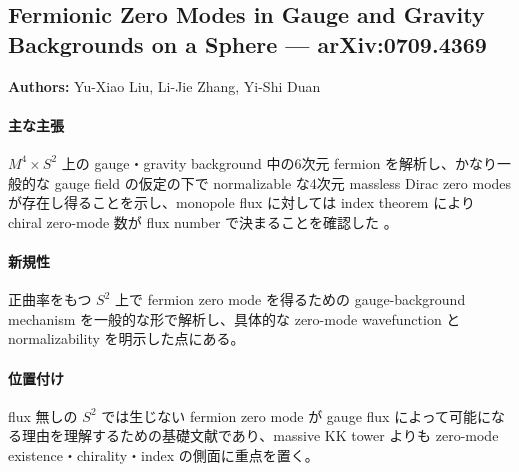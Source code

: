 \subsection{Fermionic Zero Modes in Gauge and Gravity Backgrounds on a Sphere --- arXiv:0709.4369}

\textbf{Authors:} Yu-Xiao Liu, Li-Jie Zhang, Yi-Shi Duan

\paragraph{主な主張}
$M^4\times S^2$ 上の gauge・gravity background 中の6次元 fermion を解析し、かなり一般的な gauge field の仮定の下で normalizable な4次元 massless Dirac zero modes が存在し得ることを示し、monopole flux に対しては index theorem により chiral zero-mode 数が flux number で決まることを確認した \cite{Liu:2007SphereZeroModes}。

\paragraph{新規性}
正曲率をもつ $S^2$ 上で fermion zero mode を得るための gauge-background mechanism を一般的な形で解析し、具体的な zero-mode wavefunction と normalizability を明示した点にある。

\paragraph{位置付け}
flux 無しの $S^2$ では生じない fermion zero mode が gauge flux によって可能になる理由を理解するための基礎文献であり、massive KK tower よりも zero-mode existence・chirality・index の側面に重点を置く。